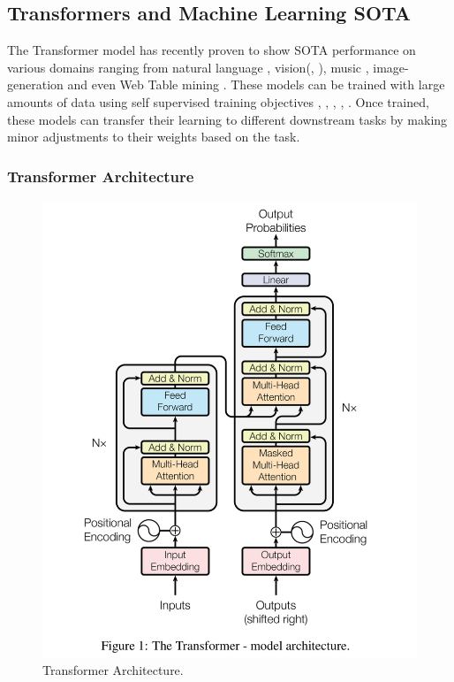 \subsection{Transformers and Machine Learning SOTA}
The Transformer model \parencite{vaswani2017attention} has recently proven to show SOTA performance on various domains ranging from natural language \parencite{brown2020language}, vision(\cite{radford2021learning}, \cite{dosovitskiy2020image}), music \parencite{huang2018music}, image-generation \parencite{ramesh2021zero} and even Web Table mining \parencite{deng2020turl}. These models can be trained with large amounts of data using self supervised training objectives \parencite{chen2020big}, \parencite{kolesnikov2019revisiting}, \parencite{goyal2019scaling}, \parencite{gidaris2018unsupervised}, \parencite{doersch2015unsupervised}. Once trained, these models can transfer their learning to different downstream tasks by making minor adjustments to their weights \parencite{howard2018universal} based on the task.  

\subsubsection{Transformer Architecture}
\begin{figure}[h]
    \centering
    \includegraphics[width=0.7\maxwidth{\textwidth}]{src/images/transformer.png}
    \caption{Transformer Architecture. }
    \label{figure\arabic{figurecounter}}
\end{figure}

